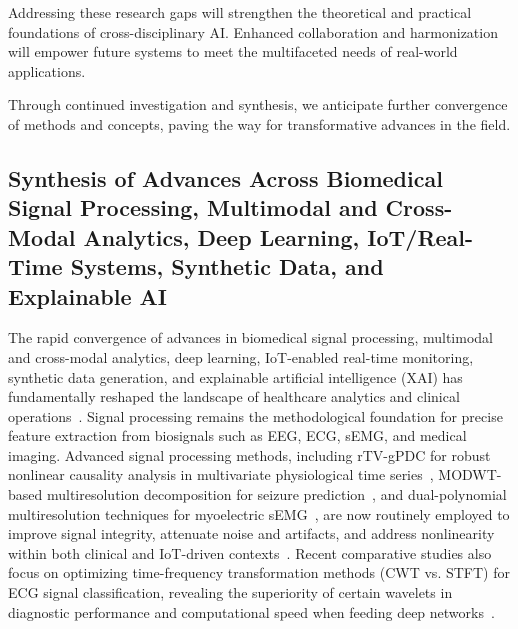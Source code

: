 \documentclass[sigconf]{acmart}
\begin{document}
Addressing these research gaps will strengthen the theoretical and practical foundations of cross-disciplinary AI. Enhanced collaboration and harmonization will empower future systems to meet the multifaceted needs of real-world applications.

Through continued investigation and synthesis, we anticipate further convergence of methods and concepts, paving the way for transformative advances in the field.

\subsection{Synthesis of Advances Across Biomedical Signal Processing, Multimodal and Cross-Modal Analytics, Deep Learning, IoT/Real-Time Systems, Synthetic Data, and Explainable AI}

The rapid convergence of advances in biomedical signal processing, multimodal and cross-modal analytics, deep learning, IoT-enabled real-time monitoring, synthetic data generation, and explainable artificial intelligence (XAI) has fundamentally reshaped the landscape of healthcare analytics and clinical operations~\cite{ref16,ref17,ref18,ref19,ref20,ref21,ref22,ref23,ref24,ref25,ref28,ref29,ref30,ref31,ref32,ref33,ref34,ref35,ref36,ref37,ref38,ref39,ref40,ref41,ref42,ref43,ref44,ref45,ref46,ref47,ref48,ref49,ref50,ref51,ref52,ref53,ref54,ref55,ref56,ref57,ref58,ref59,ref60,ref61,ref62,ref63,ref64,ref65,ref66,ref67,ref68,ref69,ref70,ref71,ref72,ref73,ref74,ref75,ref76,ref77,ref78,ref79,ref80,ref81,ref82,ref83,ref84,ref85,ref86,ref87,ref88,ref89,ref90,ref91,ref92,ref94,ref95,ref96,ref97,ref98,ref99,ref100,ref101,ref102,ref103,ref104,ref105,ref106,ref107}. Signal processing remains the methodological foundation for precise feature extraction from biosignals such as EEG, ECG, sEMG, and medical imaging. Advanced signal processing methods, including rTV-gPDC for robust nonlinear causality analysis in multivariate physiological time series~\cite{ref95}, MODWT-based multiresolution decomposition for seizure prediction~\cite{ref102}, and dual-polynomial multiresolution techniques for myoelectric sEMG~\cite{ref97}, are now routinely employed to improve signal integrity, attenuate noise and artifacts, and address nonlinearity within both clinical and IoT-driven contexts~\cite{ref16,ref17,ref19,ref95,ref97,ref102}. Recent comparative studies also focus on optimizing time-frequency transformation methods (CWT vs. STFT) for ECG signal classification, revealing the superiority of certain wavelets in diagnostic performance and computational speed when feeding deep networks~\cite{ref101}.
\end{document}
